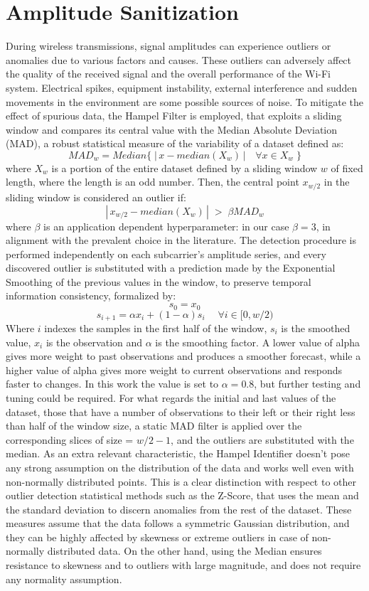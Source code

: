 \documentclass[binding=0.7cm, oneside]{sapthesis}
\begin{document}
\section{Amplitude Sanitization}
\label{sec:amp_san}
During wireless transmissions, signal amplitudes can experience outliers or anomalies due to various factors and causes. These outliers can adversely
affect the quality of the received signal and the overall performance of the Wi-Fi system. Electrical spikes, equipment instability, external interference and
sudden movements in the environment are some possible sources of noise. To mitigate the effect of spurious data, the Hampel Filter \cite{hampel_ID, Gait_hampel_pca} is employed,
that exploits a sliding window and compares its central value with the Median Absolute Deviation (MAD), a robust statistical measure of the variability of a dataset defined as:
$$ MAD_{w} = Median\{\;|\,x - median(X_{w})\,|\quad \forall x \in X_{w}\;\} $$
where $X_{w}$ is a portion of the entire dataset defined by a sliding window $w$ of fixed length, where the length is an odd number. Then, the central point $x_{w/2}$ in the sliding window
is considered an outlier if:
$$|\,x_{w/2} - median(X_{w})\,|\; >\; \beta MAD_{w}$$
where $\beta$ is an application dependent hyperparameter: in our case $\beta = 3$, in alignment with the prevalent choice in the literature.
The detection procedure is performed independently on each subcarrier’s amplitude series, and every discovered outlier is substituted
with a prediction made by the Exponential Smoothing of the previous values in the window, to preserve temporal information consistency, formalized by:
$$s_0 = x_0$$
$$ s_{i+1} = \alpha x_i + (1-\alpha)s_i \quad \; \forall i \in [0,w/2)$$
Where $i$ indexes the samples in the first half of the window, $s_i$ is the smoothed value, $x_i$ is the observation and $\alpha$ is the smoothing factor.
A lower value of alpha gives more weight to past observations and produces a smoother forecast, while a higher value of alpha gives more weight to current observations and responds faster to changes.
In this work the value is set to $\alpha = 0.8$, but further testing and tuning could be required. For what regards the initial and last values of the dataset,
those that have a number of observations to their left or their right less than half of the window size, a static MAD filter is applied over the corresponding slices of size = $w/2 - 1$, and the outliers are substituted with the median.
As an extra relevant characteristic, the Hampel Identifier doesn't pose any strong assumption on the distribution of the data and works well even with non-normally distributed points. This is a clear distinction
with respect to other outlier detection statistical methods such as the Z-Score, that uses the mean and the standard deviation to discern anomalies
from the rest of the dataset. These measures assume that the data follows a symmetric Gaussian distribution, and they can be highly affected by skewness
or extreme outliers in case of non-normally distributed data. On the other hand, using the Median ensures resistance to skewness and to outliers with large
magnitude, and does not require any normality assumption.
\end{document}
